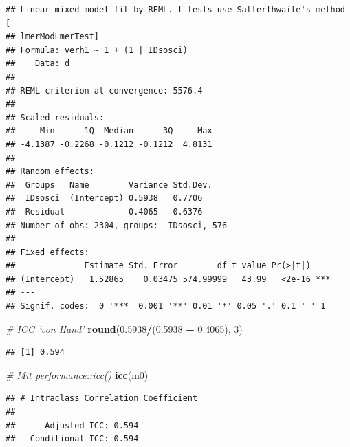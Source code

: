 \documentclass[
]{book}
\newenvironment{Shaded}{\begin{snugshade}}{\end{snugshade}}
\newcommand{\CommentTok}[1]{\textcolor[rgb]{0.56,0.35,0.01}{\textit{#1}}}
\newcommand{\DataTypeTok}[1]{\textcolor[rgb]{0.13,0.29,0.53}{#1}}
\newcommand{\DecValTok}[1]{\textcolor[rgb]{0.00,0.00,0.81}{#1}}
\newcommand{\FloatTok}[1]{\textcolor[rgb]{0.00,0.00,0.81}{#1}}
\newcommand{\KeywordTok}[1]{\textcolor[rgb]{0.13,0.29,0.53}{\textbf{#1}}}
\newcommand{\NormalTok}[1]{#1}
\newcommand{\OperatorTok}[1]{\textcolor[rgb]{0.81,0.36,0.00}{\textbf{#1}}}
\newcommand{\StringTok}[1]{\textcolor[rgb]{0.31,0.60,0.02}{#1}}
\begin{document}
\begin{Shaded}
\end{Shaded}

\begin{verbatim}
## Linear mixed model fit by REML. t-tests use Satterthwaite's method [
## lmerModLmerTest]
## Formula: verh1 ~ 1 + (1 | IDsosci)
##    Data: d
## 
## REML criterion at convergence: 5576.4
## 
## Scaled residuals: 
##     Min      1Q  Median      3Q     Max 
## -4.1387 -0.2268 -0.1212 -0.1212  4.8131 
## 
## Random effects:
##  Groups   Name        Variance Std.Dev.
##  IDsosci  (Intercept) 0.5938   0.7706  
##  Residual             0.4065   0.6376  
## Number of obs: 2304, groups:  IDsosci, 576
## 
## Fixed effects:
##              Estimate Std. Error        df t value Pr(>|t|)    
## (Intercept)   1.52865    0.03475 574.99999   43.99   <2e-16 ***
## ---
## Signif. codes:  0 '***' 0.001 '**' 0.01 '*' 0.05 '.' 0.1 ' ' 1
\end{verbatim}

\begin{Shaded}
\begin{Highlighting}[]
\CommentTok{# ICC 'von Hand'}
\KeywordTok{round}\NormalTok{(}\FloatTok{0.5938}\OperatorTok{/}\NormalTok{(}\FloatTok{0.5938} \OperatorTok{+}\StringTok{ }\FloatTok{0.4065}\NormalTok{), }\DecValTok{3}\NormalTok{)}
\end{Highlighting}
\end{Shaded}

\begin{verbatim}
## [1] 0.594
\end{verbatim}

\begin{Shaded}
\begin{Highlighting}[]
\CommentTok{# Mit performance::icc()}
\KeywordTok{icc}\NormalTok{(m0)}
\end{Highlighting}
\end{Shaded}

\begin{verbatim}
## # Intraclass Correlation Coefficient
## 
##      Adjusted ICC: 0.594
##   Conditional ICC: 0.594
\end{verbatim}
\end{document}
